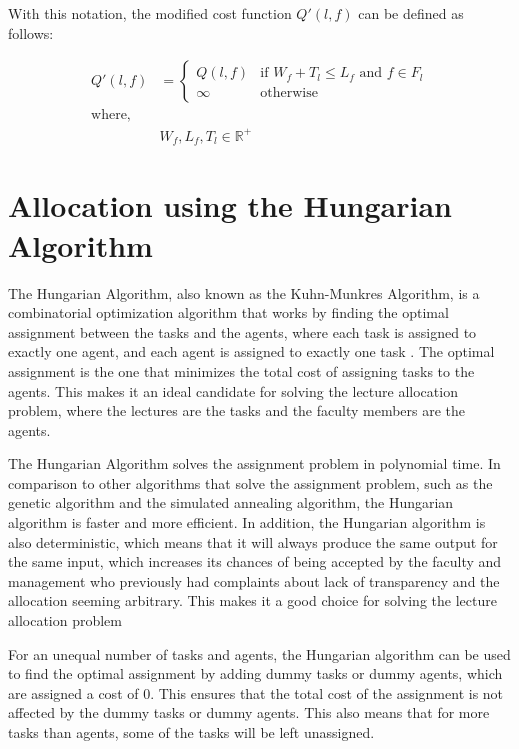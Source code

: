 With this notation, the modified cost function \( Q'(l, f) \) can be defined as follows:

\begin{equation}
  \label{eq:modified_cost_function}
  \begin{aligned}
    Q'(l, f)       & = \begin{cases}
                         Q(l, f) & \text{if } W_f + T_l \leq L_f \text{ and }f \in F_l \\
                         \infty  & \text{otherwise}
                       \end{cases} \\
    \text{where, } &                                                                 \\
                   & W_f, L_f, T_l \in \mathbb{R}^+
  \end{aligned}
\end{equation}

\section{Allocation using the Hungarian Algorithm}

The Hungarian Algorithm, also known as the Kuhn-Munkres Algorithm, is a combinatorial optimization algorithm that works by finding the optimal assignment between the tasks and the agents, where each task is assigned to exactly one agent, and each agent is assigned to exactly one task \cite{munkres1957algorithms}. The optimal assignment is the one that minimizes the total cost of assigning tasks to the agents. This makes it an ideal candidate for solving the lecture allocation problem, where the lectures are the tasks and the faculty members are the agents.

The Hungarian Algorithm solves the assignment problem in polynomial time. In comparison to other algorithms that solve the assignment problem, such as the genetic algorithm and the simulated annealing algorithm, the Hungarian algorithm is faster and more efficient. In addition, the Hungarian algorithm is also deterministic, which means that it will always produce the same output for the same input, which increases its chances of being accepted by the faculty and management who previously had complaints about lack of transparency and the allocation seeming arbitrary. This makes it a good choice for solving the lecture allocation problem \cite{bertsimas1993simulated,lambora2019genetic}

For an unequal number of tasks and agents, the Hungarian algorithm can be used to find the optimal assignment by adding dummy tasks or dummy agents, which are assigned a cost of 0. This ensures that the total cost of the assignment is not affected by the dummy tasks or dummy agents. This also means that for more tasks than agents, some of the tasks will be left unassigned.

